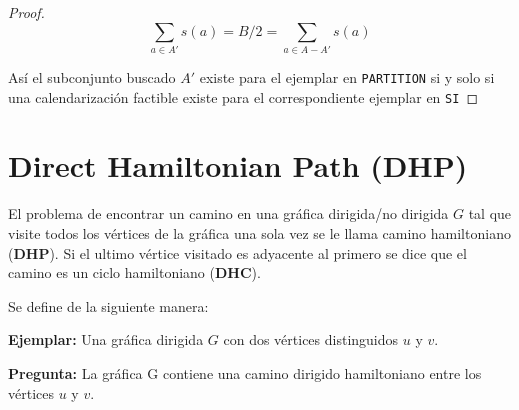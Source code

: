 \documentclass{article}
\begin{document}
\begin{proof}
  \begin{equation*}
    \sum_{a \in A'} s(a) = B / 2 = \sum_{a \in A - A'} s(a)
  \end{equation*}

  Así el subconjunto buscado $A'$ existe para el ejemplar en \texttt{PARTITION} si y solo si una calendarización factible existe para el correspondiente ejemplar en \texttt{SI}
\end{proof}

\section{Direct Hamiltonian Path (DHP)}
El problema de encontrar un camino en una gráfica dirigida/no dirigida $G$ tal que visite todos los vértices de la gráfica una sola vez se le llama camino hamiltoniano (\textbf{DHP}). Si el ultimo vértice visitado es adyacente al primero se dice que el camino es un ciclo hamiltoniano (\textbf{DHC}).

Se define de la siguiente manera:

\textbf{Ejemplar:}
Una gráfica dirigida $G$ con dos vértices distinguidos $u$ y $v$.

\textbf{Pregunta:}
La gráfica G contiene una camino dirigido hamiltoniano entre los vértices $u$ y $v$.
\end{document}
